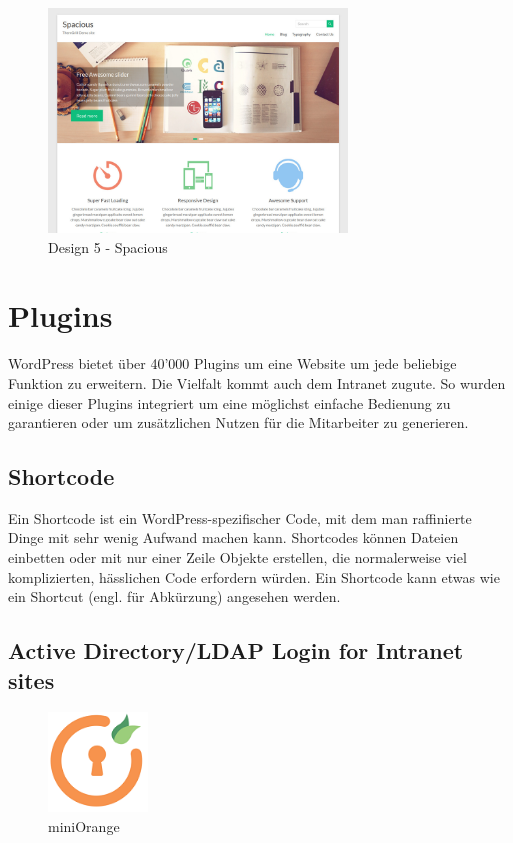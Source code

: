 \documentclass[a4paper,11pt,twoside,titlepage,openright]{report}
\numberwithin{equation}{section}		%
\numberwithin{figure}{section}			%
\numberwithin{table}{section}				%
\begin{document}
\begin{figure}[H]
\centering
\includegraphics[width=300px]{Images/Design_5.png}
\caption{Design 5 - Spacious}
\end{figure}


\chapter{Plugins}

WordPress bietet über 40'000 Plugins um eine Website um jede beliebige Funktion zu erweitern. Die Vielfalt kommt auch dem Intranet zugute. So wurden einige dieser Plugins integriert um eine möglichst einfache Bedienung zu garantieren oder um zusätzlichen Nutzen für die Mitarbeiter zu generieren.

\section{Shortcode}

Ein Shortcode ist ein WordPress-spezifischer Code, mit dem man raffinierte Dinge mit sehr wenig Aufwand machen kann. Shortcodes können Dateien einbetten oder mit nur einer Zeile Objekte erstellen, die normalerweise viel komplizierten, hässlichen Code erfordern würden. Ein Shortcode kann etwas wie ein Shortcut (engl. für Abkürzung) angesehen werden.

\section{Active Directory/LDAP Login for Intranet sites}

\begin{figure}
\vspace{-20px}
\centering
\includegraphics[width=100px]{Images/ldap.png}
\caption{miniOrange}
\end{figure}
\end{document}
